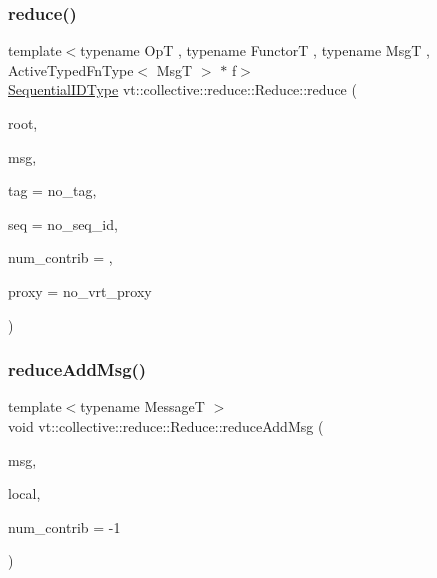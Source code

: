 \subsubsection{\texorpdfstring{reduce()}{reduce()}\hspace{0.1cm}{\footnotesize\ttfamily [3/3]}}
{\footnotesize\ttfamily template$<$typename OpT , typename FunctorT , typename MsgT , Active\+Typed\+Fn\+Type$<$ Msg\+T $>$ $\ast$ f$>$ \\
\hyperlink{namespacevt_a3063d4db3b879d6dd2c7b8d50995c7f6}{Sequential\+I\+D\+Type} vt\+::collective\+::reduce\+::\+Reduce\+::reduce (\begin{DoxyParamCaption}\item[{\hyperlink{namespacevt_a866da9d0efc19c0a1ce79e9e492f47e2}{Node\+Type} const \&}]{root,  }\item[{MsgT $\ast$}]{msg,  }\item[{\hyperlink{namespacevt_a84ab281dae04a52a4b243d6bf62d0e52}{Tag\+Type} const \&}]{tag = {\ttfamily no\+\_\+tag},  }\item[{\hyperlink{namespacevt_a3063d4db3b879d6dd2c7b8d50995c7f6}{Sequential\+I\+D\+Type} const \&}]{seq = {\ttfamily no\+\_\+seq\+\_\+id},  }\item[{\hyperlink{structvt_1_1collective_1_1reduce_1_1_reduce_a6fd4d5e956ac5acd321e57c7dad5131f}{Reduce\+Num\+Type} const \&}]{num\+\_\+contrib = {},  }\item[{\hyperlink{namespacevt_a1b417dd5d684f045bb58a0ede70045ac}{Virtual\+Proxy\+Type} const \&}]{proxy = {\ttfamily no\+\_\+vrt\+\_\+proxy} }\end{DoxyParamCaption})}

\mbox{\label{structvt_1_1collective_1_1reduce_1_1_reduce_aea636ae0bba63982be6a0ca5622750fe}} 
\subsubsection{\texorpdfstring{reduce\+Add\+Msg()}{reduceAddMsg()}}
{\footnotesize\ttfamily template$<$typename MessageT $>$ \\
void vt\+::collective\+::reduce\+::\+Reduce\+::reduce\+Add\+Msg (\begin{DoxyParamCaption}\item[{MessageT $\ast$}]{msg,  }\item[{bool const}]{local,  }\item[{\hyperlink{structvt_1_1collective_1_1reduce_1_1_reduce_a6fd4d5e956ac5acd321e57c7dad5131f}{Reduce\+Num\+Type}}]{num\+\_\+contrib = {\ttfamily -\/1} }\end{DoxyParamCaption})}

